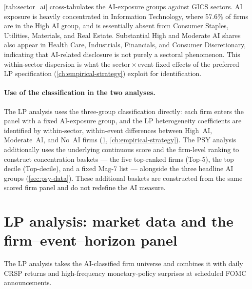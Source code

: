 \cref{tab:sector_ai} cross-tabulates the AI-exposure groups against GICS sectors. AI exposure is heavily concentrated in Information Technology, where 57.6\% of firms are in the High AI group, and is essentially absent from Consumer Staples, Utilities, Materials, and Real Estate. Substantial High and Moderate AI shares also appear in Health Care, Industrials, Financials, and Consumer Discretionary, indicating that AI-related disclosure is not purely a sectoral phenomenon. This within-sector dispersion is what the sector\,$\times$\,event fixed effects of the preferred LP specification (\cref{ch:empirical-strategy}) exploit for identification.

\begin{table}[!htbp]
\centering
\caption{AI exposure by GICS sector.}
\label{tab:sector_ai}

\end{table}

\paragraph{Use of the classification in the two analyses.} The LP analysis uses the three-group classification directly: each firm enters the panel with a fixed AI-exposure group, and the LP heterogeneity coefficients are identified by within-sector, within-event differences between High~AI, Moderate~AI, and No~AI firms (\cref{sec:lp-data}, \cref{ch:empirical-strategy}). The PSY analysis additionally uses the underlying continuous score and the firm-level ranking to construct concentration baskets --- the five top-ranked firms (Top-5), the top decile (Top-decile), and a fixed Mag-7 list --- alongside the three headline AI groups (\cref{sec:psy-data}). These additional baskets are constructed from the same scored firm panel and do not redefine the AI measure.

\section{LP analysis: market data and the firm--event--horizon panel}
\label{sec:lp-data}

The LP analysis takes the AI-classified firm universe and combines it with daily CRSP returns and high-frequency monetary-policy surprises at scheduled FOMC announcements.

